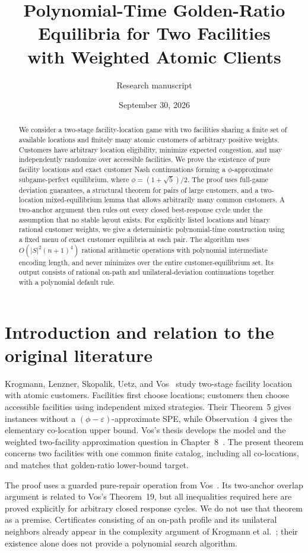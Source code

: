 \documentclass[11pt,a4paper]{article}
\title{Polynomial-Time Golden-Ratio Equilibria for Two Facilities\\with Weighted Atomic Clients}
\author{Research manuscript}
\date{September 30, 2026}
\begin{document}
\maketitle
\begin{abstract}
We consider a two-stage facility-location game with two facilities sharing a finite set of available locations and finitely many atomic customers of arbitrary positive weights. Customers have arbitrary location eligibility, minimize expected congestion, and may independently randomize over accessible facilities. We prove the existence of pure facility locations and exact customer Nash continuations forming a $\phi$-approximate subgame-perfect equilibrium, where $\phi=(1+\sqrt5)/2$. The proof uses full-game deviation guarantees, a structural theorem for pairs of large customers, and a two-location mixed-equilibrium lemma that allows arbitrarily many common customers. A two-anchor argument then rules out every closed best-response cycle under the assumption that no stable layout exists. For explicitly listed locations and binary rational customer weights, we give a deterministic polynomial-time construction using a fixed menu of exact customer equilibria at each pair. The algorithm uses $O(|S|^2(n+1)^4)$ rational arithmetic operations with polynomial intermediate encoding length, and never minimizes over the entire customer-equilibrium set. Its output consists of rational on-path and unilateral-deviation continuations together with a polynomial default rule.
\end{abstract}

\section*{Introduction and relation to the original literature}
Krogmann, Lenzner, Skopalik, Uetz, and Vos~\cite{krogmann2024}
study two-stage facility location with atomic customers. Facilities first
choose locations; customers then choose accessible facilities using independent
mixed strategies. Their Theorem~5 gives instances without a
$(\phi-\varepsilon)$-approximate SPE, while Observation~4 gives the elementary
co-location upper bound. Vos's thesis develops the model and the weighted
two-facility approximation question in Chapter~8~\cite{vos2023}.
The present theorem concerns two facilities with one common finite catalog,
including all co-locations, and matches that golden-ratio lower-bound target.

The proof uses a guarded pure-repair operation from
Vos~\cite[Lemma~29]{vos2023}. Its two-anchor overlap argument is related to
Vos's Theorem~19, but all inequalities required here are proved explicitly
for arbitrary closed response cycles. We do not use that theorem as a premise.
Certificates consisting of an on-path profile and its unilateral neighbors
already appear in the complexity argument of
Krogmann et al.~\cite[Theorem~6]{krogmann2024}; their existence alone does not
provide a polynomial search algorithm.
\end{document}
